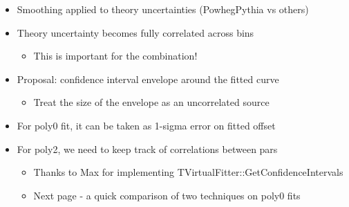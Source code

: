 {
\begin{itemize}
\item Smoothing applied to theory uncertainties (PowhegPythia vs others)
\item Theory uncertainty becomes fully correlated across bins
\begin{itemize}
\item This is important for the combination!
\end{itemize}
\item Proposal: confidence interval envelope around the fitted curve
\begin{itemize}
\item Treat the size of the envelope as an uncorrelated source
\end{itemize}
\item For poly0 fit, it can be taken as 1-sigma error on fitted offset
\item For poly2, we need to keep track of correlations between pars
\begin{itemize}
\item Thanks to Max for implementing TVirtualFitter::GetConfidenceIntervals
\item Next page - a quick comparison of two techniques on poly0 fits
\end{itemize}
\end{itemize}

}


